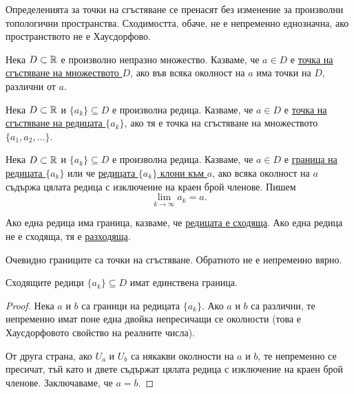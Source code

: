 \documentclass[numbers=endperiod, DIV=15, bibliography=totocnumbered]{scrartcl}
\begin{document}
\begin{note}
  Определенията за точки на сгъстяване се пренасят без изменение за произволни топологични пространства. Сходимостта, обаче, не е непременно еднозначна, ако пространството не е Хаусдорфово.
\end{note}

\begin{definition}
  Нека $D \subset \mathbb{R}$ е произволно непразно множество. Казваме, че $a \in D$ е \uline{точка на сгъстяване на множеството $D$}, ако във всяка околност на $a$ има точки на $D$, различни от $a$.
\end{definition}

\begin{definition}
  Нека $D \subset \mathbb{R}$ и $\{ a_k \} \subseteq D$ е произволна редица. Казваме, че $a \in D$ е \uline{точка на сгъстяване на редицата $\{ a_k \}$}, ако тя е точка на сгъстяване на множеството $\{ a_1, a_2, \ldots \}$.
\end{definition}

\begin{definition}
  Нека $D \subset \mathbb{R}$ и $\{ a_k \} \subseteq D$ е произволна редица. Казваме, че $a \in D$ е \uline{граница на редицата $\{ a_k \}$} или че \uline{редицата $\{ a_k \}$ клони към $a$}, ако всяка околност на $a$ съдържа цялата редица с изключение на краен брой членове. Пишем
  \begin{displaymath}
    \lim_{k \to \infty} a_k = a.
  \end{displaymath}

  Ако една редица има граница, казваме, че \uline{редицата е сходяща}. Ако една редица не е сходяща, тя е \uline{разходяща}.
\end{definition}

\begin{note}
  Очевидно границите са точки на сгъстяване. Обратното не е непременно вярно.
\end{note}

\begin{proposition}
  Сходящите редици $\{ a_k \} \subseteq D$ имат единствена граница.
\end{proposition}
\begin{proof}
  Нека $a$ и $b$ са граници на редицата $\{ a_k \}$. Ако $a$ и $b$ са различни, те непременно имат поне една двойка непресичащи се околности (това е Хаусдорфовото свойство на реалните числа).

  От друга страна, ако $U_a$ и $U_b$ са някакви околности на $a$ и $b$, те непременно се пресичат, тъй като и двете съдържат цялата редица с изключение на краен брой членове. Заключаваме, че $a = b$.
\end{proof}
\end{document}
